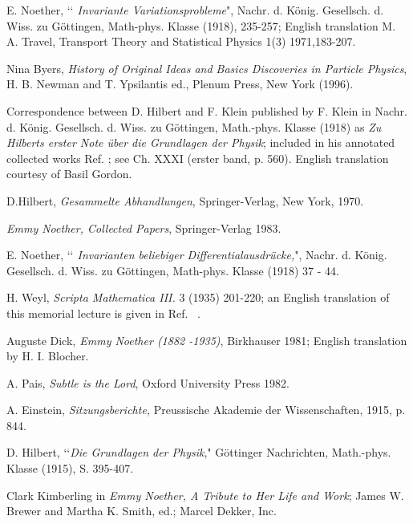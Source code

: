 \onecolumn
\baselineskip=20pt
\begin{references}


 E. Noether, 
\lq\lq{\it{ Invariante Variationsprobleme}}", Nachr. d. K\"{o}nig. Gesellsch. d.
Wiss. zu G\"{o}ttingen, Math-phys. Klasse (1918), 235-257; English translation
M. A. Travel, Transport Theory and Statistical Physics 1(3) 1971,183-207.

 Nina Byers, {\it{History of Original Ideas and Basics Discoveries
in Particle Physics}}, H. B. Newman and T. Ypsilantis ed., Plenum Press, New York (1996).

 Correspondence between D. Hilbert and F. Klein published by
F. Klein in 
Nachr.  d. K\"{o}nig. Gesellsch. d.
Wiss. zu G\"{o}ttingen, Math.-phys. Klasse (1918) as 
{\it{Zu Hilberts erster Note \"uber die Grundlagen der Physik}};  included
  in his annotated collected works Ref. \cite{felix}; see
Ch. XXXI (erster band, p. 560).  English translation courtesy of Basil Gordon.

 D.Hilbert, {\it{Gesammelte Abhandlungen}}, Springer-Verlag, New
York, 1970.
 
 {\it{Emmy Noether, Collected Papers}}, Springer-Verlag 1983.


 E. Noether, \lq\lq{\it{ Invarianten beliebiger
Differentialausdr{\"{u}}cke,}}", Nachr. d. K\"{o}nig. Gesellsch. d.
Wiss. zu G\"{o}ttingen, Math-phys. Klasse (1918) 37 - 44.

 H. Weyl,
 {\it{Scripta Mathematica III.}} 3 (1935) 201-220; an English translation of
this memorial lecture is given 
 in Ref. ~\cite{Dick}.

 Auguste Dick,{\it{ Emmy Noether (1882 -1935)}},  Birkhauser 1981; English translation by  H. I. Blocher.


 A. Pais, {\it{Subtle is the Lord}}, Oxford University Press 
1982.


 A. Einstein, {\it{Sitzungsberichte,}} Preussische Akademie
der Wissenschaften, 1915, p. 844.


 D. Hilbert, \lq\lq{\it{Die Grundlagen der Physik}}," 
G\"ottinger Nachrichten, Math.-phys. Klasse (1915), S. 395-407.



 Clark Kimberling in {\it{Emmy Noether, A Tribute to Her Life 
and Work}}; James W. Brewer and Martha K. Smith, ed.; Marcel Dekker, Inc.




\end{references}

